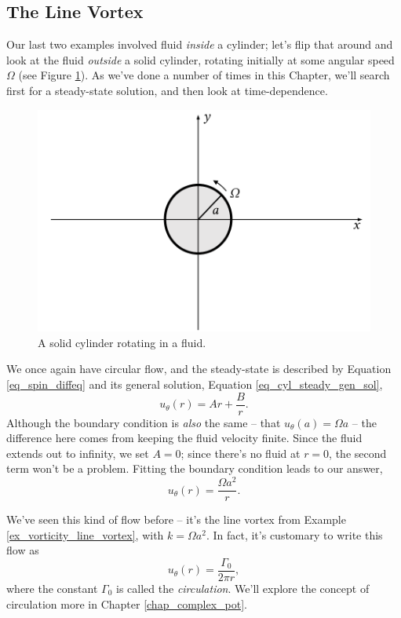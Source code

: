 
\subsection{The Line Vortex}
\label{sec_line_vortex}

Our last two examples involved fluid \emph{inside} a cylinder; let's flip that around and look at the fluid \emph{outside} a solid cylinder, rotating initially at some angular speed $\Omega$ (see Figure \ref{fig_line_setup}).  As we've done a number of times in this Chapter, we'll search first for a steady-state solution, and then look at time-dependence.

\begin{figure}
\centering
\includegraphics[width=0.7\linewidth]{Figures/Chapter2/fig_line_setup}
\caption{A solid cylinder rotating in a fluid.}
\label{fig_line_setup}
\end{figure}

We once again have circular flow, and the steady-state is described by Equation \ref{eq_spin_diffeq} and its general solution, Equation \ref{eq_cyl_steady_gen_sol},
\[
u_\theta (r) = Ar + \frac{B}{r}.
\]
Although the boundary condition is \emph{also} the same -- that $u_\theta(a) = \Omega a$ -- the difference here comes from keeping the fluid velocity finite.  Since the fluid extends out to infinity, we set $A = 0$; since there's no fluid at $r=0$, the second term won't be a problem.  Fitting the boundary condition leads to our answer,
\[
u_\theta(r) = \frac{\Omega a^2}{r}.
\]

We've seen this kind of flow before -- it's the line vortex from Example \ref{ex_vorticity_line_vortex}, with $k=\Omega a^2$.  In fact, it's customary to write this flow as
\begin{equation}
\label{eq_line_vortex}
u_\theta(r) = \frac{\Gamma_0}{2\pi r},
\end{equation}
where the constant $\Gamma_0$ is called the \emph{circulation}.  We'll explore the concept of circulation more in Chapter \ref{chap_complex_pot}.

